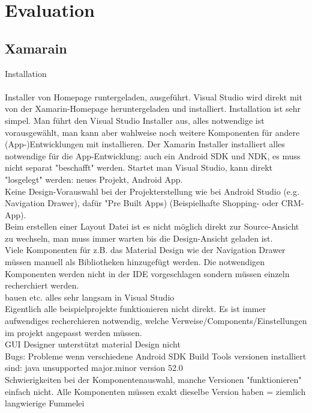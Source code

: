\chapter{Evaluation}

\section{Xamarain}

Installation
\\
\\
Installer von Homepage runtergeladen, ausgeführt. Visual Studio wird direkt mit von der Xamarin-Homepage heruntergeladen und installiert. Installation ist sehr simpel. Man führt den Visual Studio Installer aus, alles notwendige ist vorausgewählt, man kann aber wahlweise noch weitere Komponenten für andere (App-)Entwicklungen mit installieren. Der Xamarin Installer installiert alles notwendige für die App-Entwicklung: auch ein Android SDK und NDK, es muss nicht separat "beschafft" werden. Startet man Visual Studio, kann direkt "losgelegt" werden: neues Projekt, Android App. 
\\
Keine Design-Vorauswahl bei der Projekterstellung wie bei Android Studio (e.g. Navigation Drawer), dafür "Pre Built Apps) (Beispielhafte Shopping- oder CRM-App). 
\\
Beim erstellen einer Layout Datei ist es nicht möglich direkt zur Source-Ansicht zu wechseln, man muss immer warten bis die Design-Ansicht geladen ist.
\\
Viele Komponenten für z.B. das Material Design wie der Navigation Drawer müssen manuell als Bibliotheken hinzugefügt werden. Die notwendigen Komponenten werden nicht in der IDE vorgeschlagen sondern müssen einzeln recherchiert werden. 
\\
bauen etc. alles sehr langsam in Visual Studio
\\
Eigentlich alle beispielprojekte funktionieren nicht direkt. Es ist immer aufwendiges recherchieren notwendig, welche Verweise/Components/Einstellungen im projekt angepasst werden müssen.
\\
GUI Designer unterstützt material Design nicht
\\
Bugs: Probleme wenn verschiedene Android SDK Build Tools versionen installiert sind: java unsupported major.minor version 52.0 
\\
Schwierigkeiten bei der Komponentenauswahl, manche Versionen "funktionieren" einfach nicht. Alle Komponenten müssen exakt dieselbe Version haben = ziemlich langwierige Fummelei


